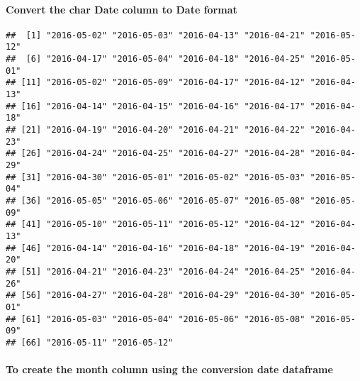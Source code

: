 \documentclass[
]{article}
\newenvironment{Shaded}{\begin{snugshade}}{\end{snugshade}}
\newcommand{\CommentTok}[1]{\textcolor[rgb]{0.56,0.35,0.01}{\textit{#1}}}
\newcommand{\FunctionTok}[1]{\textcolor[rgb]{0.00,0.00,0.00}{#1}}
\newcommand{\NormalTok}[1]{#1}
\newcommand{\OtherTok}[1]{\textcolor[rgb]{0.56,0.35,0.01}{#1}}
\newcommand{\SpecialCharTok}[1]{\textcolor[rgb]{0.00,0.00,0.00}{#1}}
\newcommand{\StringTok}[1]{\textcolor[rgb]{0.31,0.60,0.02}{#1}}
\begin{document}
\hypertarget{convert-the-char-date-column-to-date-format}{%
\paragraph{Convert the char Date column to Date
format}\label{convert-the-char-date-column-to-date-format}}

\begin{Shaded}
\end{Shaded}

\begin{verbatim}
##  [1] "2016-05-02" "2016-05-03" "2016-04-13" "2016-04-21" "2016-05-12"
##  [6] "2016-04-17" "2016-05-04" "2016-04-18" "2016-04-25" "2016-05-01"
## [11] "2016-05-02" "2016-05-09" "2016-04-17" "2016-04-12" "2016-04-13"
## [16] "2016-04-14" "2016-04-15" "2016-04-16" "2016-04-17" "2016-04-18"
## [21] "2016-04-19" "2016-04-20" "2016-04-21" "2016-04-22" "2016-04-23"
## [26] "2016-04-24" "2016-04-25" "2016-04-27" "2016-04-28" "2016-04-29"
## [31] "2016-04-30" "2016-05-01" "2016-05-02" "2016-05-03" "2016-05-04"
## [36] "2016-05-05" "2016-05-06" "2016-05-07" "2016-05-08" "2016-05-09"
## [41] "2016-05-10" "2016-05-11" "2016-05-12" "2016-04-12" "2016-04-13"
## [46] "2016-04-14" "2016-04-16" "2016-04-18" "2016-04-19" "2016-04-20"
## [51] "2016-04-21" "2016-04-23" "2016-04-24" "2016-04-25" "2016-04-26"
## [56] "2016-04-27" "2016-04-28" "2016-04-29" "2016-04-30" "2016-05-01"
## [61] "2016-05-03" "2016-05-04" "2016-05-06" "2016-05-08" "2016-05-09"
## [66] "2016-05-11" "2016-05-12"
\end{verbatim}

\hypertarget{to-create-the-month-column-using-the-conversion-date-dataframe-2}{%
\paragraph{To create the month column using the conversion date
dataframe}\label{to-create-the-month-column-using-the-conversion-date-dataframe-2}}

\begin{Shaded}
\end{Shaded}
\end{document}
